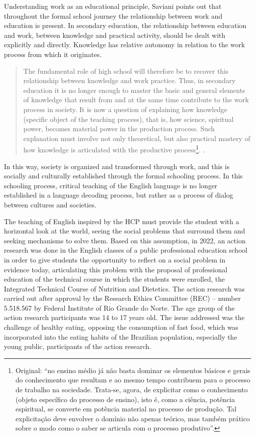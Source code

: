 \documentclass[english]{textolivre}
\begin{document}
Understanding work as an educational principle, Saviani points out that throughout the formal school journey the relationship between work and education is present. In secondary education, the relationship between education and work, between knowledge and practical activity, should be dealt with explicitly and directly. Knowledge has relative autonomy in relation to the work process from which it originates.

\begin{quote}
 The fundamental role of high school will therefore be to recover this relationship between knowledge and work practice. Thus, in secondary education it is no longer enough to master the basic and general elements of knowledge that result from and at the same time contribute to the work process in society. It is now a question of explaining how knowledge (specific object of the teaching process), that is, how science, spiritual power, becomes material power in the production process. Such explanation must involve not only theoretical, but also practical mastery of how knowledge is articulated with the productive process\footnote{Original: “no ensino médio já não basta dominar os elementos básicos e gerais do conhecimento que resultam e ao mesmo tempo contribuem para o processo de trabalho na sociedade. Trata-se, agora, de explicitar como o conhecimento (objeto específico do processo de ensino), isto é, como a ciência, potência espiritual, se converte em potência material no processo de produção. Tal explicitação deve envolver o domínio não apenas teórico, mas também prático sobre o modo como o saber se articula com o processo produtivo”.}. \cite[p.160]{saviani_trabalho_2007}.
\end{quote}


In this way, society is organized and transformed through work, and this is socially and culturally established through the formal schooling process. In this schooling process, critical teaching of the English language is no longer established in a language decoding process, but rather as a process of dialog between cultures and societies.

The teaching of English inspired by the HCP must provide the student with a horizontal look at the world, seeing the social problems that surround them and seeking mechanisms to solve them. Based on this assumption, in 2022, an action research was done in the English classes of a public professional education school in order to give students the opportunity to reflect on a social problem in evidence today, articulating this problem with the proposal of professional education of the technical course in which the students were enrolled, the Integrated Technical Course of Nutrition and Dietetics. The action research was carried out after approval by the Research Ethics Committee (REC) – number 5.518.567 by Federal Institute of Rio Grande do Norte. The age group of the action research participants was 14 to 17 years old. The issue addressed was the challenge of healthy eating, opposing the consumption of fast food, which was incorporated into the eating habits of the Brazilian population, especially the young public, participants of the action research.
\end{document}
